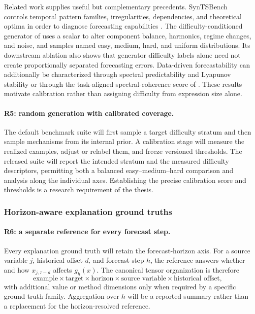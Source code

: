 Related work supplies useful but complementary precedents. SynTSBench controls
temporal pattern families, irregularities, dependencies, and theoretical
optima in order to diagnose forecasting capabilities
\citep{tan2025syntsbench}. The difficulty-conditioned generator of
\citet{cazaux2026synthetic} uses a scalar to alter component balance,
harmonics, regime changes, and noise, and samples named easy, medium, hard, and
uniform distributions. Its downstream ablation also shows that generator
difficulty labels alone need not create proportionally separated forecasting
errors. Data-driven forecastability can additionally be characterized through
spectral predictability and Lyapunov stability \citep{wang2025forecastability}
or through the task-aligned spectral-coherence score of
\citet{feng2025predictability}. These results motivate calibration rather than
assigning difficulty from expression size alone.

\paragraph{R5: random generation with calibrated coverage.}
The default benchmark suite will first sample a target difficulty stratum and
then sample mechanisms from its internal prior. A calibration stage will
measure the realized examples, adjust or relabel them, and freeze versioned
thresholds. The released suite will report the intended stratum and the
measured difficulty descriptors, permitting both a balanced easy--medium--hard
comparison and analysis along the individual axes. Establishing the precise
calibration score and thresholds is a research requirement of the thesis.

\subsubsection{Horizon-aware explanation ground truths}

\paragraph{R6: a separate reference for every forecast step.}
Every explanation ground truth will retain the forecast-horizon axis. For a
source variable $j$, historical offset $d$, and forecast step $h$, the
reference answers whether and how $x_{j,\tau-d}$ affects $g_h(x)$. The canonical
tensor organization is therefore
\[
\boxed{
\text{example}\times
\text{target}\times
\text{horizon}\times
\text{source variable}\times
\text{historical offset},
}
\]
with additional value or method dimensions only when required by a specific
ground-truth family. Aggregation over $h$ will be a reported summary rather
than a replacement for the horizon-resolved reference.

